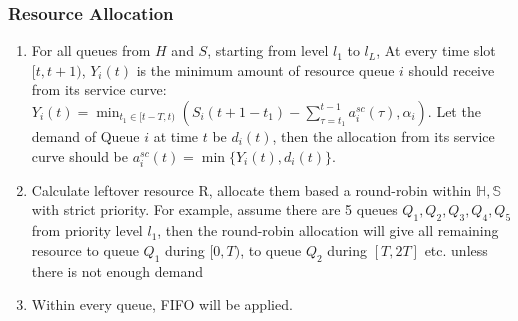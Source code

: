 \subsubsection*{Resource Allocation}
\begin{enumerate}
	\item For all queues from $H$ and $S$, starting from level $l_1$ to $l_L$, At every time slot $[t,t+1)$, $Y_i(t)$ is the minimum amount of resource queue $i$ should receive from its service curve:
	 $Y_i (t) = \min_{t_1 \in [t-T,t)} (S_i(t+1-t_1)-\sum_{\tau=t_1}^{t-1}a^{sc}_i(\tau), \alpha_i)$. Let the demand of Queue $i$ at time $t$ be $d_i(t)$, then the allocation from its service curve should be $a^{sc}_i(t) = \min\{Y_i(t), d_i(t)\}$.
	\item Calculate leftover resource R, allocate them based a round-robin within $\mathbb{H},\mathbb{S}$ with strict priority. For example, assume there are 5 queues $Q_1,Q_2,Q_3,Q_4,Q_5$ from priority level $l_1$, then the round-robin allocation will give all remaining resource to queue  $Q_1$ during $[0,T)$, to queue $Q_2$ during $[T,2T]$ etc. unless there is not enough demand
	\item Within every queue, FIFO will be applied.
\end{enumerate}

